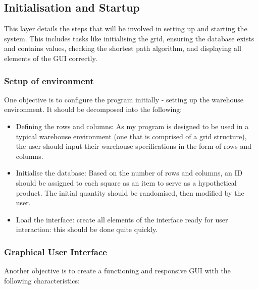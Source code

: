 \newpage

\subsection{Initialisation and Startup}

This layer details the steps that will be involved in setting up and starting the system. This includes tasks like initialising the grid, ensuring the database exists and contains values, checking the shortest path algorithm, and displaying all elements of the GUI correctly.

\subsubsection{Setup of environment}

One objective is to configure the program initially - setting up the warehouse environment. It should be decomposed into the following:

\begin{itemize}
    \item Defining the rows and columns: As my program is designed to be used in a typical warehouse environment (one that is comprised of a grid structure), the user should input their warehouse specifications in the form of rows and columns.

    \item Initialise the database: Based on the number of rows and columns, an ID should be assigned to each square as an item to serve as a hypothetical product. The initial quantity should be randomised, then modified by the user.

    \item Load the interface: create all elements of the interface ready for user interaction: this should be done quite quickly.

\end{itemize} 

\subsubsection{Graphical User Interface}

Another objective is to create a functioning and responsive GUI with the following characteristics:

